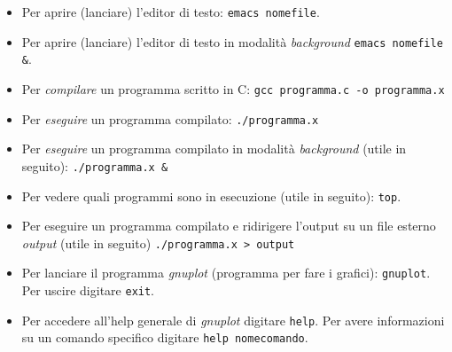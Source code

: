 \documentclass[11pt]{article}
\begin{document}
\begin{itemize}
\item Per aprire (lanciare) l'editor di testo: \texttt{emacs nomefile}.
\item Per aprire (lanciare) l'editor di testo in modalit\`a {\em background}
  \texttt{emacs nomefile \&}.
\item Per {\em compilare} un programma scritto in C:
  \texttt{gcc programma.c -o programma.x} 
\item Per {\em eseguire} un programma compilato:
  \texttt{./programma.x}
\item Per {\em eseguire} un programma compilato in modalit\`a {\em background} (utile in seguito):
  \texttt{./programma.x \&}
  \item Per vedere quali programmi sono in esecuzione (utile in seguito): \texttt{top}.
\item Per eseguire un programma compilato e ridirigere l'output su un file esterno {\em output} (utile in seguito) \texttt{./programma.x > output} 
\item Per lanciare il programma {\em gnuplot} (programma per fare i grafici):
  \texttt{gnuplot}. Per uscire digitare \texttt{exit}.
\item Per accedere all'help generale di {\em gnuplot} digitare  \texttt{help}.
  Per avere informazioni su un comando specifico digitare \texttt{help nomecomando}.
\end{itemize}
\end{document}
